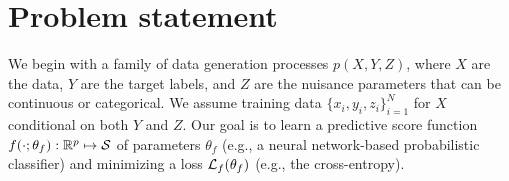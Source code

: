 \documentclass[twocolumn,superscriptaddress,aps]{revtex4-1}
\theoremstyle{plain}
\begin{document}
\section{Problem statement}
\label{sec:problem}
%
%

We begin with a family of data generation processes $p(X,Y,Z)$, where $X$ are
the data, $Y$ are the target labels, and $Z$ are the nuisance parameters that
can be continuous or categorical. We assume training
data $\{x_i, y_i, z_i\}_{i=1}^N$ for $X$ conditional on both $Y$ and $Z$. Our goal is to learn a predictive
score function $f(\cdot;\theta_f) : \mathbb{R}^p \mapsto {\cal S}$ of parameters
$\theta_f$ (e.g., a neural network-based probabilistic classifier) and
minimizing  a loss ${\cal L}_f(\theta_f)$ (e.g., the cross-entropy).
\end{document}
